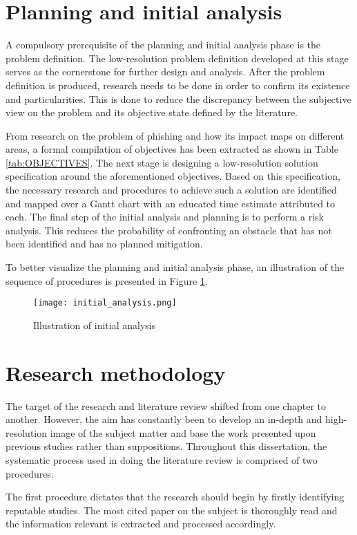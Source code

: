 \section{Planning and initial analysis}
A compulsory prerequisite of the planning and initial analysis phase is the problem definition. The low-resolution problem definition developed at this stage serves as the cornerstone for further design and analysis. After the problem definition is produced, research needs to be done in order to confirm its existence and particularities. This is done to reduce the discrepancy between the subjective view on the problem and its objective state defined by the literature.

From research on the problem of phishing and how its impact maps on different areas, a formal compilation of objectives has been extracted as shown in Table \ref{tab:OBJECTIVES}. The next stage is designing a low-resolution solution specification around the aforementioned objectives. Based on this specification, the necessary research and procedures to achieve such a solution are identified and mapped over a Gantt chart with an educated time estimate attributed to each. The final step of the initial analysis and planning is to perform a risk analysis. This reduces the probability of confronting an obstacle that has not been identified and has no planned mitigation.

To better visualize the planning and initial analysis phase, an illustration of the sequence of procedures is presented in Figure \ref{fig:INITIAL_ANALYSIS}.

\begin{figure}
	\centering
	\texttt{[image: initial\_analysis.png]}
	\caption{Illustration of initial analysis}
	\label{fig:INITIAL_ANALYSIS}
\end{figure}

\section{Research methodology}
The target of the research and literature review shifted from one chapter to another. However, the aim has constantly been to develop an in-depth and high-resolution image of the subject matter and base the work presented upon previous studies rather than suppositions. Throughout this dissertation, the systematic process used in doing the literature review is comprised of two procedures.

The first procedure dictates that the research should begin by firstly identifying reputable studies. The most cited paper on the subject is thoroughly read and the information relevant is extracted and processed accordingly.

